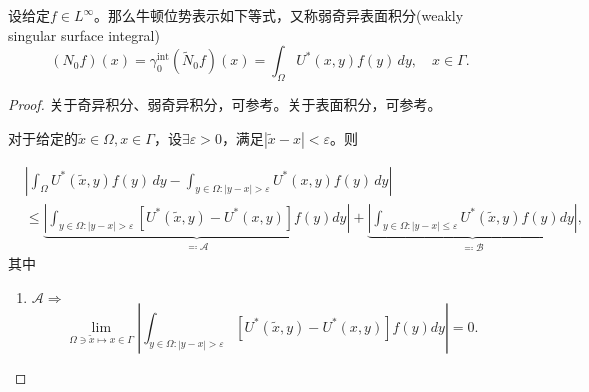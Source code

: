 \begin{lemma}[牛顿位势算子方程的表现式]
  \label{lemma:bvp-newton-gen-sing-suf-integral}
  设给定$f \in L^{\infty}$。那么牛顿位势表示如下等式，又称弱奇异表面积分(weakly singular surface integral)
  \begin{equation*}
    \left( N_{0} f \right) (x) = \gamma_{0}^{\text{int}} \left( \widetilde{N}_{0} f \right) (x) = \int_{\Omega} U^{*}(x,y) f(y) \, dy, \quad x \in \Gamma.
  \end{equation*}
\end{lemma}
\begin{proof}
  关于奇异积分、弱奇异积分，可参考\cite{Neri:1971bg, Vainikko:1993dw}。关于表面积分，可参考\cite[Ch.10]{Callahan:2010bg}。

  对于给定的$\widetilde{x} \in \Omega, x \in \Gamma$，设$\exists \varepsilon > 0$，满足$| \widetilde{x} - x  | < \varepsilon$。则

  \begin{equation}
    \label{eq:bvp-newton-gen-sing-suf-integral}
    \begin{split}
  &\left|
  \int_{\Omega} U^{*}(\widetilde{x}, y) f(y) \, dy -
  \int_{y \in \Omega: | y - x | > \varepsilon} U^{*}(x,y) f(y) \, dy
  \right| \\
  &\le
   \underbrace{
   \left|
   \int_{y \in \Omega: |y - x| > \varepsilon}
   \left[ U^{*}(\widetilde{x}, y) - U^{*}(x, y) \right]
   f(y) d y
   \right|
   }_{\eqqcolon \mathcal{A}}
   + \underbrace{
   \left|
   \int_{y \in \Omega: |y - x| \le \varepsilon}
   U^{*}(\widetilde{x}, y) f(y) dy
   \right|
   }_{\eqqcolon \mathcal{B}},
 \end{split}
  \end{equation}
其中
\begin{enumerate}
\item $\mathcal{A} \Rightarrow$
\begin{equation*}
  \lim_{\Omega \ni \widetilde{x} \mapsto x \in \Gamma}
  \left|
  \int_{y \in \Omega: |y - x| > \varepsilon}
  \left[ U^{*}(\widetilde{x}, y) - U^{*}(x, y) \right]
  f(y) d y
  \right|
  = 0.
\end{equation*}


\end{enumerate}
\end{proof}

